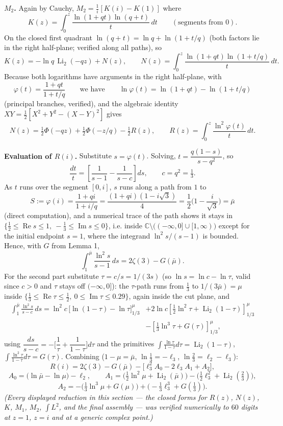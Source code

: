 \documentclass[11pt]{article}
\theoremstyle{remark}
\begin{document}
\textbf{$M_2$.} Again by Cauchy, $M_2=\frac1i[K(i)-K(1)]$ where
\[
K(z)=\int_0^z\frac{\ln(1+qt)\ln(q+t)}{t}\,dt\qquad(\text{segments from }0).
\]
On the closed first quadrant $\ln(q+t)=\ln q+\ln(1+t/q)$ (both factors lie in the right half-plane; verified along all paths), so
\[
K(z)=-\ln q\,\operatorname{Li}_2(-qz)+N(z),\qquad
N(z)=\int_0^z\frac{\ln(1+qt)\ln(1+t/q)}{t}\,dt .
\]
Because both logarithms have arguments in the right half-plane, with
\[
\varphi(t)=\frac{1+qt}{1+t/q}\qquad\text{we have}\qquad \ln\varphi(t)=\ln(1+qt)-\ln(1+t/q)
\]
(principal branches, verified), and the algebraic identity $XY=\tfrac12[X^2+Y^2-(X-Y)^2]$ gives
\begin{equation*}
N(z)=\tfrac12\Phi(-qz)+\tfrac12\Phi(-z/q)-\tfrac12 R(z),\qquad
R(z)=\int_0^z\frac{\ln^2\varphi(t)}{t}\,dt. \tag{3.3}
\end{equation*}

\textbf{Evaluation of $R(i)$.} Substitute $s=\varphi(t)$. Solving, $t=\dfrac{q(1-s)}{s-q^2}$, so
\[
\frac{dt}{t}=\left[\frac{1}{s-1}-\frac{1}{s-c}\right]ds,\qquad c=q^2=\tfrac13 .
\]
As $t$ runs over the segment $[0,i]$, $s$ runs along a path from $1$ to
\[
S:=\varphi(i)=\frac{1+qi}{1+i/q}=\frac{(1+qi)(1-i\sqrt3)}{4}
=\frac12\Big(1-\frac{i}{\sqrt3}\Big)=\bar\mu
\]
(direct computation), and a numerical trace of the path shows it stays in $\{\tfrac12\le\operatorname{Re}s\le1,\ -\tfrac13\le\operatorname{Im}s\le 0\}$, i.e. inside $\mathbb C\setminus\big((-\infty,0]\cup[1,\infty)\big)$ except for the initial endpoint $s=1$, where the integrand $\ln^2 s/(s-1)$ is bounded. Hence, with $G$ from Lemma 1,
\[
\int_{1}^{\bar\mu}\frac{\ln^2 s}{s-1}\,ds=2\zeta(3)-G(\bar\mu).
\]
For the second part substitute $\tau=c/s=1/(3s)$ (so $\ln s=\ln c-\ln\tau$, valid since $c>0$ and $\tau$ stays off $(-\infty,0]$): the $\tau$-path runs from $\tfrac13$ to $1/(3\bar\mu)=\mu$ inside $\{\tfrac13\le\operatorname{Re}\tau\le\tfrac12,\ 0\le\operatorname{Im}\tau\le0.29\}$, again inside the cut plane, and
\[
\begin{aligned}
\int_1^{\bar\mu}\frac{\ln^2s}{s-c}\,ds
=\ln^2\!c\,\Big[\ln(1-\tau)-\ln\tau\Big]_{1/3}^{\mu}
&+2\ln c\left[\tfrac12\ln^2\tau+\operatorname{Li}_2(1-\tau)\right]_{1/3}^{\mu}\\
&-\left[\tfrac13\ln^3\tau+G(\tau)\right]_{1/3}^{\mu},
\end{aligned}
\]
using $\dfrac{ds}{s-c}=-\Big[\dfrac1\tau+\dfrac1{1-\tau}\Big]d\tau$ and the primitives
$\int\frac{\ln\tau}{1-\tau}d\tau=\operatorname{Li}_2(1-\tau)$, $\int\frac{\ln^2\tau}{1-\tau}d\tau=G(\tau)$.
Combining ($1-\mu=\bar\mu$, $\ln\tfrac13=-\ell_3$, $\ln\tfrac23=\ell_2-\ell_3$):
\begin{equation*}
R(i)=2\zeta(3)-G(\bar\mu)-\Big[\ell_3^2A_0-2\ell_3A_1+A_2\Big], \tag{3.4}
\end{equation*}
\[
A_0=\big(\ln\bar\mu-\ln\mu\big)-\ell_2,\qquad
A_1=\Big(\tfrac12\ln^2\mu+\operatorname{Li}_2(\bar\mu)\Big)-\Big(\tfrac12\ell_3^2+\operatorname{Li}_2(\tfrac23)\Big),
\]
\[
A_2=-\Big(\tfrac13\ln^3\mu+G(\mu)\Big)+\Big(-\tfrac13\ell_3^3+G(\tfrac13)\Big).
\]
\textit{(Every displayed reduction in this section --- the closed forms for $R(z)$, $N(z)$, $K$, $M_1$, $M_2$, $\int L^2$, and the final assembly --- was verified numerically to $60$ digits at $z=1$, $z=i$ and at a generic complex point.)}
\end{document}
